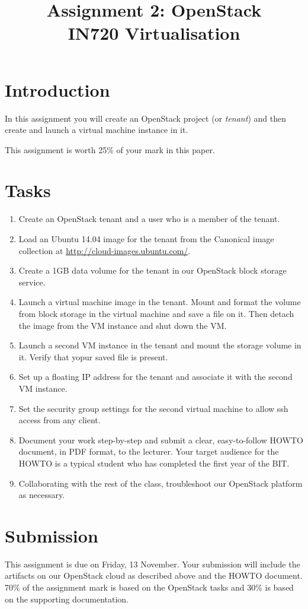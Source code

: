 \documentclass{article}
\begin{document}
\title{Assignment 2: OpenStack \\ IN720 Virtualisation}
\date{}
\maketitle

\section*{Introduction}
In this assignment you will create an OpenStack project (or \emph{tenant}) and then create and launch a virtual machine instance in it.

This assignment is worth 25\% of your mark in this paper.

\section{Tasks}

\begin{enumerate}
	\item Create an OpenStack tenant and a user who is a member of the tenant.
	\item Load an Ubuntu 14.04 image for the tenant from the Canonical image collection at \url{http://cloud-images.ubuntu.com/}.
	\item Create a 1GB data volume for the tenant in our OpenStack block storage service.
	\item Launch a virtual machine image in the tenant.  Mount and format the volume from block storage in the virtual machine 
	and save a file on it.  Then detach the image from the VM instance and shut down the VM.
	\item Launch a second VM instance in the tenant and mount the storage volume in it.  Verify that yopur saved file is present.
	\item Set up a floating IP address for the tenant and associate it with the second VM instance.
	\item Set the security group settings for the second virtual machine to allow ssh access from any client.
	\item Document your work step-by-step and submit a clear, easy-to-follow HOWTO document, in PDF format, to the lecturer.  Your target audience for the HOWTO is a typical student who has completed the first year of the BIT.
	\item Collaborating with the rest of the class, troubleshoot our OpenStack platform as necessary.
\end{enumerate}

\section{Submission}
This assignment is due on Friday, 13 November. Your submission will include the artifacts on our OpenStack cloud as described above and the HOWTO 
document.  70\% of the assignment mark is based on the OpenStack tasks and 30\% is based on the supporting documentation. 
\end{document}
